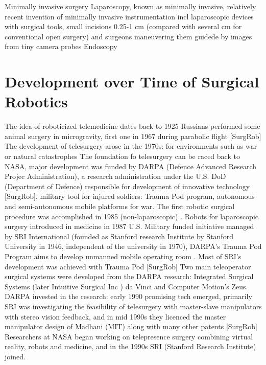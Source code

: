 Minimally invasive surgery
Laparoscopy, known as minimally invasive, relatively recent invention of minimally invasive instrumentation incl laparoscopic devices with surgical tools, small incisions 0.25-1 cm (compared with several cm for conventional open surgery) and surgeons maneuvering them guidede by images from tiny camera probes
Endoscopy



\section{Development over Time of Surgical Robotics}
The idea of roboticized telemedicine dates back to 1925 \citep{bib:telemed_predict}
Russians performed some animal surgery in microgravity, first one in 1967 during parabolic flight [SurgRob]
The development of telesurgery arose in the 1970s: for environments such as war or natural catastrophes
The foundation fo telesurgery can be raced back to NASA, major development was funded by DARPA (Defence Advanced Research Projec Administration), a research administration under the U.S. DoD (Department of Defence) responsible for development of innovative technology [SurgRob], military tool for injured soldiers: Trauma Pod program, autonomous and semi-autonomous mobile platforms for war.
The first robotic surgical procedure was accomplished in 1985 (non-laparoscopic) \citep{bib:telesurg_history}. %
Robots for laparoscopic surgery introduced in medicine in 1987 \citep{bib:brown_univ}
U.S. Military funded initiative managed by SRI International (founded as Stanford research Institute by Stanford University in 1946, independent of the university in 1970), DARPA's Trauma Pod Program aims to develop unmanned mobile operating room \citep{bib:docatadist}. Most of SRI's development was achieved with Trauma Pod [SurgRob]
Two main teleoperator surgical systems were developed from the DARPA research: Integrated Surgical Systems (later Intuitive Surgical Inc \citep{bib:brown_univ}) da Vinci and Computer Motion's Zeus. \citep{bib:telesurg_history}
DARPA invested in the research: early 1990 promising tech emerged, primarily SRI was investigating the feasibility of telesurgery with master-slave manipulators with stereo vision feedback, and in mid 1990s they licenced the master manipulator design of Madhani (MIT) along with many other patents [SurgRob]
Researchers at NASA began working on telepresence surgery combining virtual reality, robots and medicine, and in the 1990s SRI (Stanford Research Institute) joined. \citep{bib:brown_univ}
